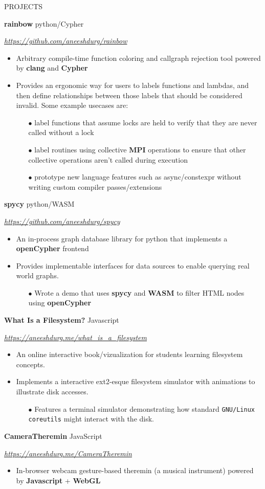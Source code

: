 \documentclass[paper=a4,fontsize=11pt]{scrartcl} %
\newcommand{\NewPart}[1]{ \noindent \large \usefont{OT1}{phv}{b}{n}\uppercase{#1} \normalfont \normalsize}
\newcommand{\EducationEntry}[4]{
		\noindent \textbf{#1}     %
			\hfill#2 \par  %
		\noindent \textit{#3} \par        %
		\noindent\hangafter=0 \small #4 %
		\normalsize \par}
\begin{document}
\vspace{0.5em}
\NewPart{Projects}{}

\EducationEntry{rainbow}{python/Cypher}{\url{https://github.com/aneeshdurg/rainbow}}{
\begin{itemize}
  \item Arbitrary compile-time function coloring and callgraph rejection tool powered by \textbf{clang} and \textbf{Cypher}
\item Provides an ergonomic way for users to labels functions and lambdas, and then define relationships between those labels that should be considered invalid. Some example usecases are:
  \begin{itemize}
    \item[$\bullet$] label functions that assume locks are held to verify that they are never called without a lock
    \item[$\bullet$] label routines using collective \textbf{MPI} operations to ensure that other collective operations aren't called during execution
    \item[$\bullet$] prototype new language features such as async/constexpr without writing custom compiler passes/extensions
  \end{itemize}
\end{itemize}
}

\EducationEntry{spycy}{python/WASM}{\url{https://github.com/aneeshdurg/spycy}}{
\begin{itemize}
  \item An in-process graph database library for python that implements a \textbf{openCypher} frontend
  \item Provides implementable interfaces for data sources to enable querying real world graphs.
  \begin{itemize}
    \item[$\bullet$] Wrote a demo that uses \textbf{spycy} and \textbf{WASM} to filter HTML nodes using \textbf{openCypher}
  \end{itemize}
\end{itemize}
}

\EducationEntry{What Is a Filesystem?}{Javascript}{\url{https://aneeshdurg.me/what_is_a_filesystem}}{
\begin{itemize}
\item An online interactive book/vizualization for students learning filesystem concepts.
\item Implements a interactive ext2-esque filesystem simulator with animations to illustrate disk accesses.
  \begin{itemize}
    \item[$\bullet$] Features a terminal simulator demonstrating how standard \texttt{GNU/Linux coreutils} might interact with the disk.
  \end{itemize}
\end{itemize}
}
\EducationEntry{CameraTheremin}{JavaScript}{\url{https://aneeshdurg.me/CameraTheremin}}{
\begin{itemize}
  \item In-browser webcam gesture-based theremin (a musical instrument) powered by \textbf{Javascript} + \textbf{WebGL}
\end{itemize}
}
\end{document}
